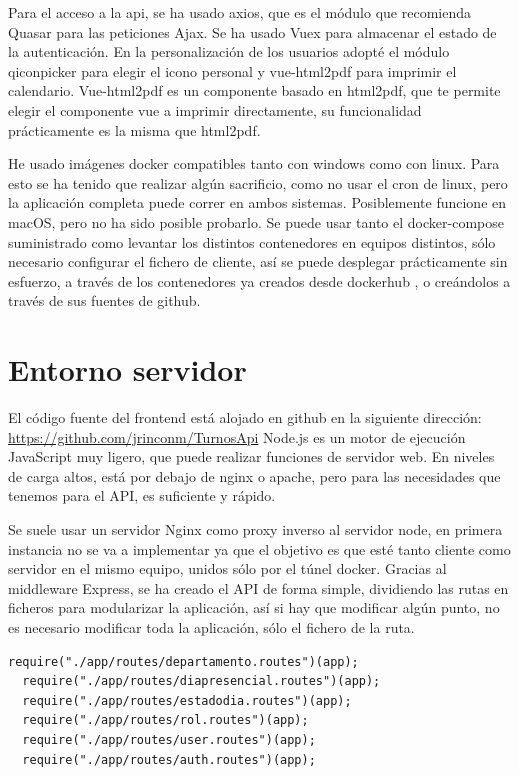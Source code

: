 \documentclass[11pt,spanish,listoffigures,listoftables]{tfgetsinf}
\begin{document}
Para el acceso a la api, se ha usado axios, que es el módulo que recomienda Quasar para las peticiones Ajax. Se ha usado Vuex para almacenar el estado de la autenticación.
En la personalización de los usuarios adopté el módulo qiconpicker para elegir el icono personal y vue-html2pdf para imprimir el calendario. Vue-html2pdf es un componente basado en html2pdf, que te permite elegir el componente vue a imprimir directamente, su funcionalidad prácticamente es la misma que html2pdf.

He usado imágenes docker compatibles tanto con windows como con linux. Para esto se ha tenido que realizar algún sacrificio, como no usar el cron de linux, pero la aplicación completa puede correr en ambos sistemas. Posiblemente funcione en macOS, pero no ha sido posible probarlo.
Se puede usar tanto el docker-compose suministrado como levantar los distintos contenedores en equipos distintos, sólo necesario configurar el fichero de cliente, así se puede desplegar prácticamente sin esfuerzo, a través de los contenedores ya creados desde dockerhub , o creándolos a través de sus fuentes de github. 

\section{Entorno servidor}
El código fuente del frontend está alojado en github en la siguiente dirección: \url{https://github.com/jrinconm/TurnosApi}
Node.js es un motor de ejecución JavaScript muy ligero, que puede realizar funciones de servidor web. 
En niveles de carga altos, está por debajo de nginx o apache, pero para las necesidades que tenemos para el API, es suficiente y rápido.

Se suele usar un servidor Nginx como proxy inverso al servidor node, en primera instancia no se va a implementar ya que el objetivo es que esté tanto cliente como servidor en el mismo equipo, unidos sólo por el túnel docker.
Gracias al middleware Express, se ha creado el API de forma simple, dividiendo las rutas en ficheros para modularizar la aplicación, así si hay que modificar algún punto, no es necesario modificar toda la aplicación, sólo el fichero de la ruta.

\begin{lstlisting}[style=ES6, caption={Importación rutas para Express}]
  require("./app/routes/departamento.routes")(app);
  require("./app/routes/diapresencial.routes")(app);
  require("./app/routes/estadodia.routes")(app);
  require("./app/routes/rol.routes")(app);
  require("./app/routes/user.routes")(app);
  require("./app/routes/auth.routes")(app);
\end{lstlisting}
\end{document}
